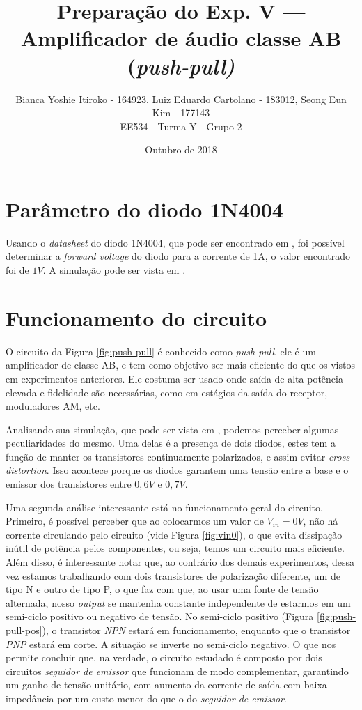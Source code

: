 \documentclass{article}
\begin{document}
    \title{Preparação do Exp. V — Amplificador de áudio classe AB (\emph{push-pull)}}
    \author{Bianca Yoshie Itiroko - 164923, Luiz Eduardo Cartolano - 183012, Seong Eun Kim - 177143 \\ EE534 - Turma Y - Grupo 2}
    \date{Outubro de 2018}

    \maketitle

    \section{Parâmetro do diodo 1N4004}
        Usando o \emph{datasheet} do diodo 1N4004, que pode ser encontrado em , foi possível determinar a \emph{forward voltage} do diodo para a corrente de 1A, o valor encontrado foi de $1V$. A simulação pode ser vista em .

    \section{Funcionamento do circuito} \label{sec:1}
        O circuito da Figura \ref{fig:push-pull} é conhecido como \emph{push-pull}, ele é um amplificador de classe AB, e tem como objetivo ser mais eficiente do que os vistos em experimentos anteriores. Ele costuma ser usado onde saída de alta potência elevada e fidelidade são necessárias, como em estágios da saída do receptor, moduladores AM, etc.
        
        Analisando sua simulação, que pode ser vista em , podemos perceber algumas peculiaridades do mesmo. Uma delas é a presença de dois diodos, estes tem a função de manter os transistores continuamente polarizados, e  assim evitar \emph{cross-distortion}. Isso acontece porque os diodos garantem uma tensão entre a base e o emissor dos transistores entre $0,6V$ e $0,7V$.
        
        Uma segunda análise interessante está no funcionamento geral do circuito. Primeiro, é possível perceber que ao colocarmos um valor de $V_{in} = 0V$, não há corrente circulando pelo circuito (vide Figura \ref{fig:vin0}), o que evita dissipação inútil de potência pelos componentes, ou seja, temos um circuito mais eficiente. Além disso, é interessante notar que, ao contrário dos demais experimentos, dessa vez estamos trabalhando com dois transistores de polarização diferente, um de tipo N e outro de tipo P, o que faz com que, ao usar uma fonte de tensão alternada, nosso \emph{output} se mantenha constante independente de estarmos em um semi-ciclo positivo ou negativo de tensão. No semi-ciclo positivo (Figura \ref{fig:push-pull-pos}), o transistor \emph{NPN} estará em funcionamento, enquanto que o transistor \emph{PNP} estará em corte. A situação se inverte no semi-ciclo negativo. O que nos permite concluir que, na verdade, o circuito estudado é composto por dois circuitos \emph{seguidor de emissor} que funcionam de modo complementar, garantindo um ganho de tensão unitário, com aumento da corrente de saída com baixa impedância por um custo menor do que o do \emph{seguidor de emissor}.
 
\end{document}
